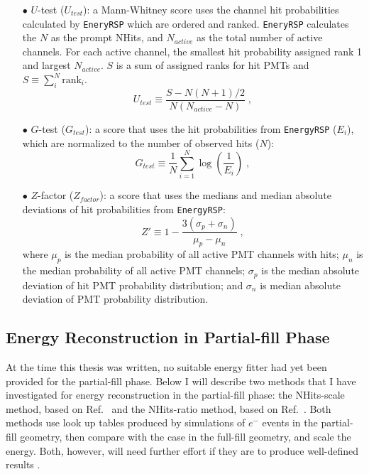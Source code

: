 \begin{itemize}
	\item[$\bullet$]$U$-test ($U_{test}$):
	a Mann-Whitney score uses the channel hit probabilities calculated by \texttt{EneryRSP} which are ordered and ranked. \texttt{EneryRSP} calculates the $N$ as the prompt NHits, and $N_{active}$ as the total number of active channels. For each active channel, the smallest hit probability assigned rank 1 and largest $N_{active}$. $S$ is a sum of assigned ranks for hit PMTs and $S\equiv \sum_{i}^N \mathrm{rank}_i$.
	\begin{equation}
	U_{test}\equiv \frac{S-N(N+1)/2}{N(N_{active}-N)}\; ,
	\end{equation}

	\item[$\bullet$] $G$-test ($G_{test}$):
 	a score that uses the hit probabilities from \texttt{EnergyRSP} ($E_i$), which are normalized to the number of observed hits ($N$):
	\begin{equation}
	G_{test}\equiv \frac{1}{N}\sum_{i=1}^N \log(\frac{1}{E_i})\; ,
	\end{equation}
	
	\item[$\bullet$] $Z$-factor ($Z_{factor}$):
	a score that uses the medians and median absolute deviations of hit probabilities from \texttt{EnergyRSP}:
	\begin{equation}
     Z'\equiv 1-\frac{3(\sigma_p+\sigma_n)}{\mu_p-\mu_n}\; ,
    \end{equation}
    where $\mu_p$ is the median probability of all active PMT channels with hits; $\mu_n$ is the median probability of all active PMT channels; $\sigma_p$ is the median absolute deviation of hit PMT probability distribution; and $\sigma_n$ is median absolute deviation of PMT probability distribution.
\end{itemize}

\subsection{Energy Reconstruction in Partial-fill Phase}

At the time this thesis was written, no suitable energy fitter had yet been provided for the partial-fill phase. Below I will describe two methods that I have investigated for energy reconstruction in the partial-fill phase: the NHits-scale method, based on Ref.~\cite{partialEnergy} and the NHits-ratio method, based on Ref.~\cite{partialEnergyYang}. Both methods use look up tables produced by simulations of $e^-$ events in the partial-fill geometry, then compare with the case in the full-fill geometry, and scale the energy. Both, however, will need further effort if they are to produce well-defined results \cite{jiePartialEnergy,jiePartialEnergyNhitRatio}.

